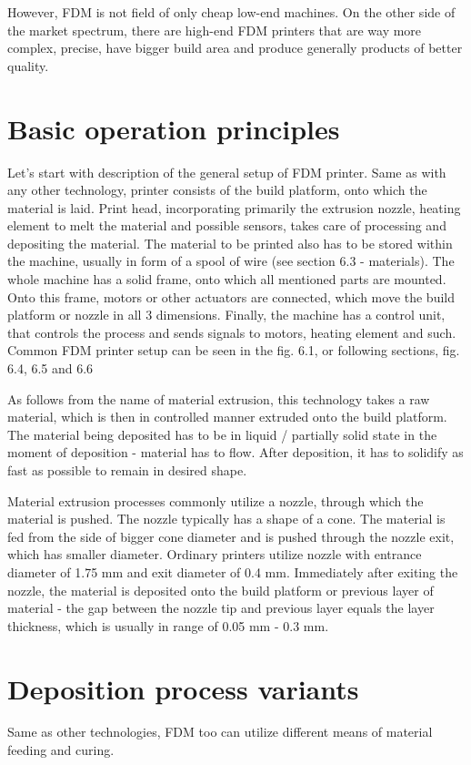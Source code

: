 \documentclass[a4paper, 11pt, reqno]{report}
\begin{document}
	However, FDM is not field of only cheap low-end machines. On the other side of the market spectrum, there are high-end FDM printers that are way more complex, precise, have bigger build area and produce generally products of better quality.

\section{Basic operation principles}
Let's start with description of the general setup of FDM printer. Same as with any other technology, printer consists of the build platform, onto which the material is laid. Print head, incorporating primarily the extrusion nozzle, heating element to melt the material and possible sensors, takes care of processing and depositing the material. The material to be printed also has to be stored within the machine, usually in form of a spool of wire (see section 6.3 - materials). The whole machine has a solid frame, onto which all mentioned parts are mounted. Onto this frame, motors or other actuators are connected, which move the build platform or nozzle in all 3 dimensions. Finally, the machine has a control unit, that controls the process and sends signals to motors, heating element and such.	Common FDM printer setup can be seen in the fig. 6.1, or following sections, fig. 6.4, 6.5 and 6.6
	
	As follows from the name of material extrusion, this technology takes a raw material, which is then in controlled manner extruded onto the build platform. The material being deposited has to be in liquid / partially solid state in the moment of deposition - material has to flow. After deposition, it has to solidify as fast as possible to remain in desired shape.
	
	Material extrusion processes commonly utilize a nozzle, through which the material is pushed. The nozzle typically has a shape of a cone. The material is fed from the side of bigger cone diameter and is pushed through the nozzle exit, which has smaller diameter. Ordinary printers utilize nozzle with entrance diameter of 1.75 mm and exit diameter of 0.4 mm. Immediately after exiting the nozzle, the material is deposited onto the build platform or previous layer of material - the gap between the nozzle tip and previous layer equals the layer thickness, which is usually in range of 0.05 mm - 0.3 mm.

\section{Deposition process variants}
Same as other technologies, FDM too can utilize different means of material feeding and curing.
\end{document}
